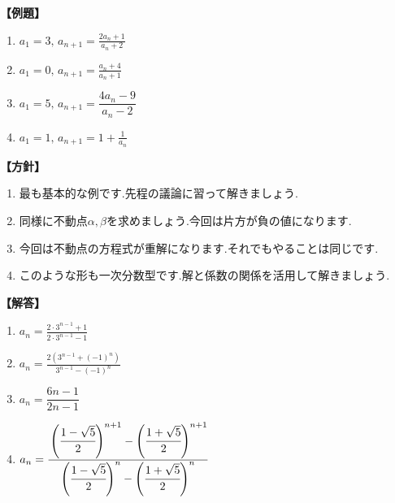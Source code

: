     \noindent \textbf{【例題】}
    \begin{enumerate}[label=(\arabic*),parsep=3pt]
      \item $\displaystyle a_1=3,\, a_{n+1}=\frac{2a_n+1}{a_n+2}$
      \item $\displaystyle a_1=0,\, a_{n+1}=\frac{a_n+4}{a_n+1}$
      \item $\displaystyle a_1=5,\, a_{n+1}=\dfrac{4a_{n}-9}{a_{n}-2}$
      \item $\displaystyle a_1=1,\, a_{n+1}=1+\frac{1}{a_n}$
    \end{enumerate}

    \noindent\textbf{【方針】}
    \begin{enumerate}[label=(\arabic*),parsep=3pt]
      \item 最も基本的な例です.先程の議論に習って解きましょう.
      \item 同様に不動点$\alpha,\beta$を求めましょう.今回は片方が負の値になります.
      \item 今回は不動点の方程式が重解になります.それでもやることは同じです.
      \item このような形も一次分数型です.解と係数の関係を活用して解きましょう.
    \end{enumerate}

    \noindent\textbf{【解答】}
    \begin{enumerate}[label=(\arabic*),parsep=3pt]
      \item $\displaystyle a_n=\frac{2\cdot3^{n-1}+1}{2\cdot3^{n-1}-1}$
      \item $\displaystyle a_n=\frac{2\left(3^{n-1}+(-1)^n\right)}{3^{n-1}-(-1)^n}$
      \item $a_{n}=\dfrac{6n-1}{2n-1}$
      \item $\displaystyle a_n=\cfrac{\left(\cfrac{1-\sqrt{5}}{2}\right)^{n+1}-\left(\cfrac{1+\sqrt{5}}{2}\right)^{n+1}}{\left(\cfrac{1-\sqrt{5}}{2}\right)^n-\left(\cfrac{1+\sqrt{5}}{2}\right)^n}$
    \end{enumerate}

